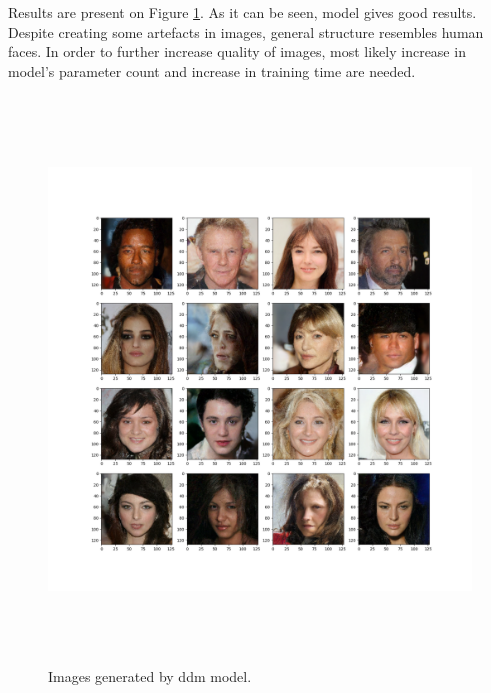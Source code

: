 \documentclass[10pt]{article}
\begin{document}
Results are present on Figure \ref{fig:diffusion_model}. As it can be seen, model gives good results. Despite creating some artefacts in images, general structure resembles human faces. In order to further increase quality of images, most likely increase in model's parameter count and increase in training time are needed.

\begin{figure}[H]
\hspace*{-2cm}  
    \includegraphics[width=15cm, height = 15cm]{test_batch_DDM_0.png}
    \caption{Images generated by ddm model.}
    \label{fig:diffusion_model}
\end{figure}
\end{document}
